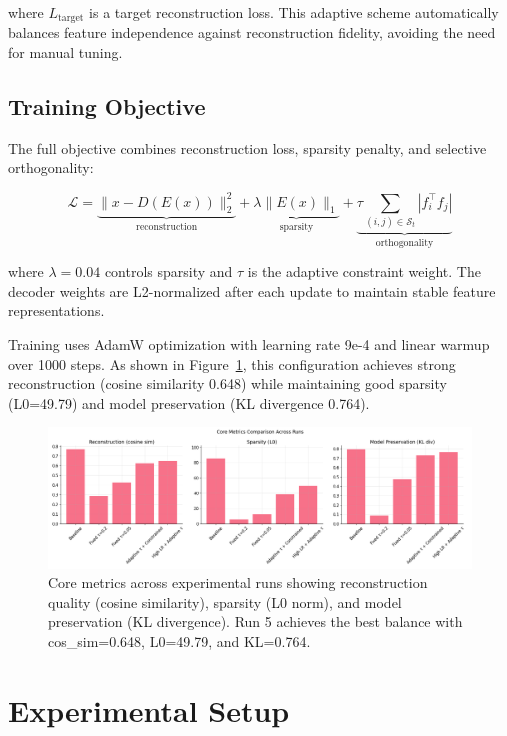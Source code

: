 \documentclass{article} %
\begin{document}
where $L_{\text{target}}$ is a target reconstruction loss. This adaptive scheme automatically balances feature independence against reconstruction fidelity, avoiding the need for manual tuning.

\subsection{Training Objective}
The full objective combines reconstruction loss, sparsity penalty, and selective orthogonality:

\begin{equation}
    \mathcal{L} = \underbrace{\|x - D(E(x))\|_2^2}_{\text{reconstruction}} + \underbrace{\lambda\|E(x)\|_1}_{\text{sparsity}} + \underbrace{\tau\sum_{(i,j) \in \mathcal{S}_t} |f_i^\top f_j|}_{\text{orthogonality}}
\end{equation}

where $\lambda=0.04$ controls sparsity and $\tau$ is the adaptive constraint weight. The decoder weights are L2-normalized after each update to maintain stable feature representations.

Training uses AdamW optimization with learning rate 9e-4 and linear warmup over 1000 steps. As shown in Figure~\ref{fig:core_metrics}, this configuration achieves strong reconstruction (cosine similarity 0.648) while maintaining good sparsity (L0=49.79) and model preservation (KL divergence 0.764).

\begin{figure}[t]
    \centering
    \includegraphics[width=\linewidth]{core_metrics_comparison.png}
    \caption{Core metrics across experimental runs showing reconstruction quality (cosine similarity), sparsity (L0 norm), and model preservation (KL divergence). Run 5 achieves the best balance with cos\_sim=0.648, L0=49.79, and KL=0.764.}
    \label{fig:core_metrics}
\end{figure}

\section{Experimental Setup}
\label{sec:experimental}
\end{document}

